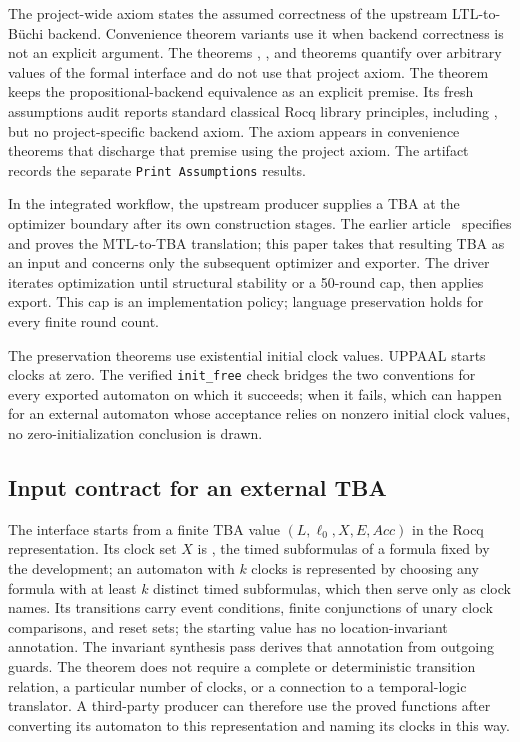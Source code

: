 \documentclass{ieeeaccess}
\begin{document}
The project-wide axiom  states the assumed
correctness of the upstream LTL-to-B\"uchi backend. Convenience theorem
variants use it when backend correctness is not an explicit argument. The
theorems , , and
 theorems quantify over arbitrary values of the
formal interface and do not use that project axiom. The theorem
 keeps the propositional-backend
equivalence as an explicit premise. Its fresh assumptions audit reports
standard classical Rocq library principles, including
, but no project-specific
backend axiom. The axiom  appears in
convenience theorems that discharge that premise using the project axiom.
The artifact records the separate \texttt{Print Assumptions} results.

In the integrated workflow, the upstream producer supplies a TBA at the
optimizer boundary after its own construction stages. The earlier article~\cite{fares_bodeveix_mtl_translation} specifies and
proves the MTL-to-TBA translation; this paper takes that resulting TBA as an
input and concerns only the subsequent optimizer and exporter. The driver
iterates optimization until structural stability or a 50-round cap, then
applies export. This cap is an implementation policy; language preservation
holds for every finite round count.

The preservation theorems use existential initial clock values. UPPAAL starts clocks at zero. The verified \texttt{init\_free} check bridges the two conventions for every exported automaton on which it succeeds; when it fails, which can happen for an external automaton whose acceptance relies on nonzero initial clock values, no zero-initialization conclusion is drawn.

\subsection{Input contract for an external TBA}
\label{sec:generic-input}
The interface starts from a finite TBA value
$(L,\ell_0,X,E,\mathit{Acc})$ in the Rocq representation. Its clock set
$X$ is , the timed subformulas of a formula 
fixed by the development; an automaton with $k$ clocks is represented by
choosing any formula with at least $k$ distinct timed subformulas, which then
serve only as clock names. Its transitions carry
event conditions, finite conjunctions of unary clock comparisons, and reset
sets; the starting value has no location-invariant annotation. The invariant
synthesis pass derives that annotation from outgoing guards. The theorem
does not require a complete or deterministic transition relation, a particular
number of clocks, or a connection to a temporal-logic translator. A third-party
producer can therefore use the proved functions after converting its automaton
to this representation and naming its clocks in this way.
\end{document}
